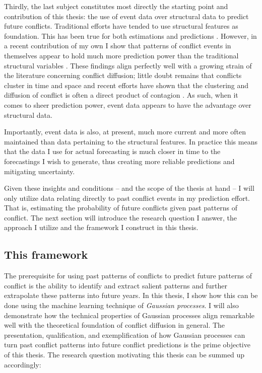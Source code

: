 \documentclass[a4paper]{article}
\begin{document}
Thirdly, the last subject constitutes most directly the starting point and contribution of this thesis: the use of event data over structural data to predict future conflicts. Traditional efforts have tended to use structural features as foundation. This has been true for both estimations and predictions \cite[10]{chadefaux2017conflict}. However, in a recent contribution of my own I show that patterns of conflict events in themselves appear to hold much more prediction power than the traditional structural variables \citep{Maase}. These findings align perfectly well with a growing strain of the literature concerning conflict diffusion; little doubt remains that conflicts cluster in time and space \citep[15]{crost2015conflict} and recent efforts have shown that the clustering and diffusion of conflict is often a direct product of contagion \citep{buhaug2008contagion,schutte2011diffusion,crost2015conflict,bara_2017}. As such, when it comes to sheer prediction power, event data appears to have the advantage over structural data.\par

Importantly, event data is also, at present, much more current and more often maintained than data pertaining to the structural features. In practice this means that the data I use for actual forecasting is much closer in time to the forecastings I wish to generate, thus creating more reliable predictions and mitigating uncertainty.\par

Given these insights and conditions -- and the scope of the thesis at hand -- I will only utilize data relating directly to past conflict events in my prediction effort. That is, estimating the probability of future conflicts given past patterns of conflict. The next section will introduce the research question I answer, the approach I utilize and the framework I construct in this thesis.\par

\subsection{This framework}

The prerequisite for using past patterns of conflicts to predict future patterns of conflict is the ability to identify and extract salient patterns and further extrapolate these patterns into future years. In this thesis, I show how this can be done using the machine learning technique of \emph{Gaussian processes}. I will also demonstrate how the technical properties of Gaussian processes align remarkable well with the theoretical foundation of conflict diffusion in general.  The presentation, qualification, and exemplification of how Gaussian processes can turn past conflict patterns into future conflict predictions is the prime objective of this thesis. The research question motivating this thesis can be summed up accordingly:\par
\end{document}
